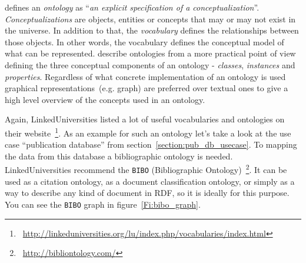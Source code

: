 {\citet{jour:gruber} defines an \textit{ontology} as ``\textit{an explicit specification of a conceptualization}''.
\textit{Conceptualizations} are objects, entities or concepts that may or may not exist in the universe. In addition to that, the \textit{vocabulary} defines the relationships between those objects. In other words, the vocabulary defines the conceptual model of what can be represented. 
\citet{jour:owl} describe ontologies from a more practical point of view defining the three conceptual components of an ontology - \textit{classes}, \textit{instances} and \textit{properties}. Regardless of what concrete implementation of an ontology is used graphical representations~(e.g. graph) are preferred over textual ones to give a high level overview of the concepts used in an ontology. 

Again, LinkedUniversities listed a lot of useful vocabularies and ontologies on their website~\footnote{~\url{http://linkeduniversities.org/lu/index.php/vocabularies/index.html}}. As an example for such an ontology let's take a look at the use case ``publication database'' from section~\ref{section:pub_db_usecase}. To mapping the data from this database a bibliographic ontology is needed. LinkedUniversities recommend the \texttt{BIBO} (Bibliographic Ontology)~\footnote{~\url{http://bibliontology.com/}}. It can be used as a citation ontology, as a document classification ontology, or simply as a way to describe any kind of document in RDF, so it is ideally for this purpose. You can see the \texttt{BIBO} graph in figure~\ref{Fi:bibo_graph}.

}
